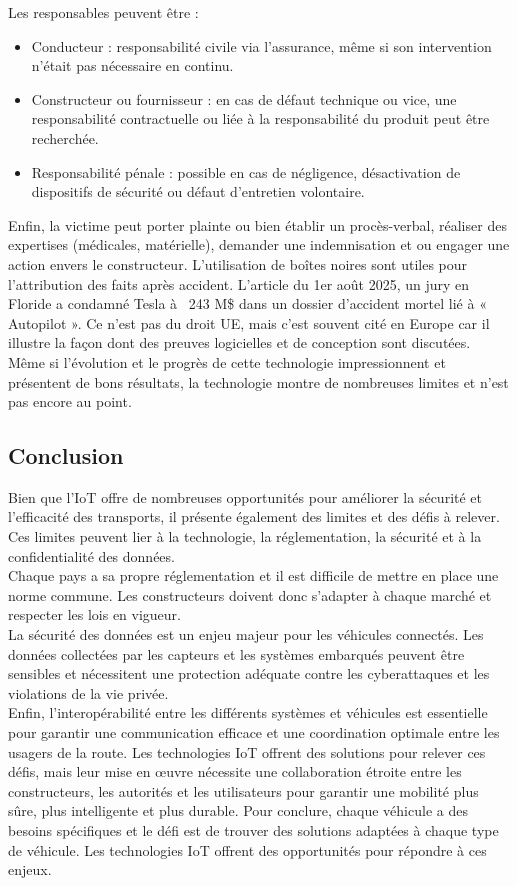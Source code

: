Les responsables peuvent être :
\begin{itemize}
    \item Conducteur : responsabilité civile via l’assurance, même si son intervention n’était pas nécessaire en continu.
    \item Constructeur ou fournisseur : en cas de défaut technique ou vice, une responsabilité contractuelle ou liée à la responsabilité du produit peut être recherchée.
    \item Responsabilité pénale : possible en cas de négligence, désactivation de dispositifs de sécurité ou défaut d’entretien volontaire.
\end{itemize}
Enfin, la victime peut porter plainte ou bien établir un procès-verbal, réaliser des expertises (médicales, matérielle), demander une indemnisation et ou engager une action envers le constructeur. L'utilisation de boîtes noires sont utiles pour l’attribution des faits après accident. L'article\cite{tesla_condamnation} du 1er août 2025, un jury en Floride a condamné Tesla à ~243 M\$ dans un dossier d’accident mortel lié à « Autopilot ». Ce n’est pas du droit UE, mais c’est souvent cité en Europe car il illustre la façon dont des preuves logicielles et de conception sont discutées.\\
Même si l'évolution et le progrès de cette technologie impressionnent et présentent de bons résultats, la technologie montre de nombreuses limites et n'est pas encore au point.

\newpage
\subsection{Conclusion}
Bien que l’IoT offre de nombreuses opportunités pour améliorer la sécurité et l’efficacité des transports, il présente également des limites et des défis à relever. Ces limites peuvent lier à la technologie, la réglementation, la sécurité et à la confidentialité des données.\\
Chaque pays a sa propre réglementation et il est difficile de mettre en place une norme commune. Les constructeurs doivent donc s'adapter à chaque marché et respecter les lois en vigueur.\\
La sécurité des données est un enjeu majeur pour les véhicules connectés. Les données collectées par les capteurs et les systèmes embarqués peuvent être sensibles et nécessitent une protection adéquate contre les cyberattaques et les violations de la vie privée.\\
Enfin, l'interopérabilité entre les différents systèmes et véhicules est essentielle pour garantir une communication efficace et une coordination optimale entre les usagers de la route. Les technologies IoT offrent des solutions pour relever ces défis, mais leur mise en œuvre nécessite une collaboration étroite entre les constructeurs, les autorités et les utilisateurs pour garantir une mobilité plus sûre, plus intelligente et plus durable.
Pour conclure, chaque véhicule a des besoins spécifiques et le défi est de trouver des solutions adaptées à chaque type de véhicule. Les technologies IoT offrent des opportunités pour répondre à ces enjeux.\\